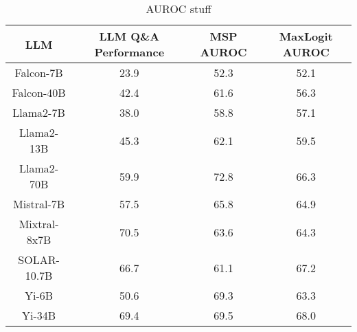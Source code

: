 \renewcommand\arraystretch{1.35}
\begin{table*}[tb]
\centering
\begin{tabular}{c|c|c|c}
LLM & LLM Q\&A Performance & MSP AUROC & MaxLogit AUROC\\ \hline
Falcon-7B & 23.9 & 52.3 & 52.1\\
Falcon-40B & 42.4 & 61.6 & 56.3\\
Llama2-7B & 38.0 & 58.8 & 57.1\\
Llama2-13B & 45.3 & 62.1 & 59.5\\
Llama2-70B & 59.9 & 72.8 & 66.3\\
Mistral-7B & 57.5 & 65.8 & 64.9\\
Mixtral-8x7B & 70.5 & 63.6 & 64.3\\
SOLAR-10.7B & 66.7 & 61.1 & 67.2\\
Yi-6B & 50.6 & 69.3 & 63.3\\
Yi-34B & 69.4 & 69.5 & 68.0\\
\hline
\end{tabular}
\caption{AUROC stuff}
\end{table*}
\label{tab:auroc}
